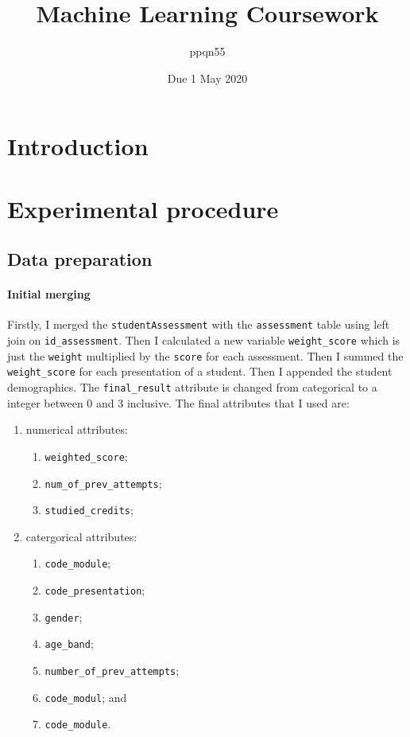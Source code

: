 \documentclass[a4paper]{article}
\title{Machine Learning Coursework}
\date{Due 1 May 2020}
\author{ppqn55}
\begin{document}
\maketitle

\section{Introduction}


\section{Experimental procedure}

\subsection{Data preparation}

\paragraph{Initial merging}

Firstly, I merged the \texttt{studentAssessment} with the \texttt{assessment}
table using left join on \texttt{id\_assessment}.
Then I calculated a new variable \texttt{weight\_score}
which is just the \texttt{weight} multiplied by the \texttt{score}
for each assessment.
Then I summed the \texttt{weight\_score} for each presentation of a student.
Then I appended the student demographics.
The \texttt{final\_result} attribute is changed from categorical to
a integer between 0 and 3 inclusive.
The final attributes that I used are:
\begin{enumerate}
    \item numerical attributes:
        \begin{enumerate}
            \item \texttt{weighted\_score};
            \item \texttt{num\_of\_prev\_attempts};
            \item \texttt{studied\_credits};
        \end{enumerate}
    \item catergorical attributes:
        \begin{enumerate}
            \item \texttt{code\_module};
            \item \texttt{code\_presentation};
            \item \texttt{gender};
            \item \texttt{age\_band};
            \item \texttt{number\_of\_prev\_attempts};
            \item \texttt{code\_modul}; and
            \item \texttt{code\_module}.
        \end{enumerate}
\end{enumerate}
\end{document}
